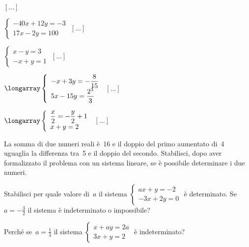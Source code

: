 \begin{esercizio}
\begin{multicols}{2}
\begin{enumeratea}
 \hfill \(\left[...\right]\)
\item \(\left\{\begin{array}{l}-40x+12y=-3\\17x-2y=100\end{array}\right.\)
 \hfill \(\left[...\right]\)
\item \(\left\{\begin{array}{l}x-y=3 \\-x+y=1 \end{array}\right.\)
 \hfill \(\left[...\right]\)
\item \(\longarray\left\{\begin{array}{l}
-x+3y=-{\dfrac{8}{15}}\\
5x-15y=\dfrac{2^{3}}{3}\end{array}\right.\)
 \hfill \(\left[...\right]\)
\item \(\longarray\left\{\begin{array}{l}
\dfrac{x}{2}=-{\dfrac{y}{2}}+1\\
x+y=2\end{array}\right.\)
 \hfill \(\left[...\right]\)
\end{enumeratea}
\end{multicols}
\end{esercizio}

\begin{esercizio}
 \label{ese:22.34}
La somma di due numeri reali è~16 e il doppio del
primo aumentato di~4 uguaglia la differenza tra~5 e il doppio del
secondo. Stabilisci, dopo aver formalizzato il problema con un sistema
lineare, se è possibile determinare i due numeri.
\end{esercizio}

\begin{esercizio}
 \label{ese:22.35}
Stabilisci per quale valore di~\(a\) il sistema
\(\left\{\begin{array}{l}ax+y=-2\\-3x+2y=0\end{array}\right.\) è
determinato. Se~\(a=-{\frac{3}{2}}\) il sistema è indeterminato o
impossibile?
\end{esercizio}

\begin{esercizio}
 \label{ese:22.36}
Perché se~\(a=\frac{1}{3}\) il sistema
\(\left\{\begin{array}{l}x+ay=2a\\3x+y=2\end{array}\right.\) è
indeterminato?
\end{esercizio}

